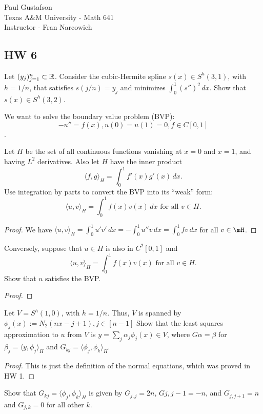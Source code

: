 \documentclass{article}
\begin{document}
\noindent Paul Gustafson\\
\noindent Texas A\&M University - Math 641\\ 
\noindent Instructor - Fran Narcowich

\subsection*{HW 6}
 Let $(y_j)_{j=1}^n \subset \mathbb{R}$. Consider the cubic-Hermite spline $s(x) \in S^h(3,1)$, with $h = 1/n$, that satisfies $s(j/n) = y_j$ and minimizes $\int_0^1 (s'')^2 \, dx$. Show that $s(x) \in S^h(3,2)$.


 We want to solve the boundary value problem (BVP): 
$$-u'' = f(x), u(0) = u(1) = 0, f \in C[0,1]$$.

 Let $H$ be the set of all continuous functions vanishing at $x = 0$ and $x = 1$, and having $L^2$ derivatives. Also let $H$ have the inner product
$$\langle f, g \rangle_H = \int_0^1 f'(x) g'(x) \, dx.$$
Use integration by parts to convert the BVP into its ``weak'' form:
$$\langle u, v \rangle_H = \int_0^1 f(x) v(x) \, dx \text{ for all } v \in H.$$
\begin{proof}
We have $\langle u, v \rangle_H = \int_0^1 u' v' \, dx =  - \int_0^1 u'' v \, dx = \int_0^1 f v \, dx$ for all $v \in \mH$.
\end{proof}

 Conversely, suppose that $u \in H$ is also in $C^2[0,1]$ and 
$$\langle u, v \rangle_H  = \int_0^1 f(x) v(x) \text{ for all } v \in H.$$
Show that $u$ satisfies the BVP.
\begin{proof}

\end{proof}


 Let $V = S^h(1,0)$, with $h = 1/n$. Thus, $V$ is spanned by $\phi_j(x) := N_2(nx - j+1), j \in [n-1]$ Show that the least squares approximation to $u$ from $V$ is $y = \sum_j \alpha_j \phi_j(x) \in V$, where $G \alpha = \beta$ for $\beta_j = \langle y , \phi_j \rangle_H$ and $G_{kj} = \langle \phi_j, \phi_k \rangle_H$.

\begin{proof}
This is just the definition of the normal equations, which was proved in HW 1.
\end{proof}

 Show that $G_{kj} = \langle \phi_j, \phi_k \rangle_H$ is given by
$G_{j,j} = 2n$, $G{j,j-1} = -n$, and $G_{j, j+1} = n$ and $G_{j,k} = 0$ for all other $k$.
\end{document}

